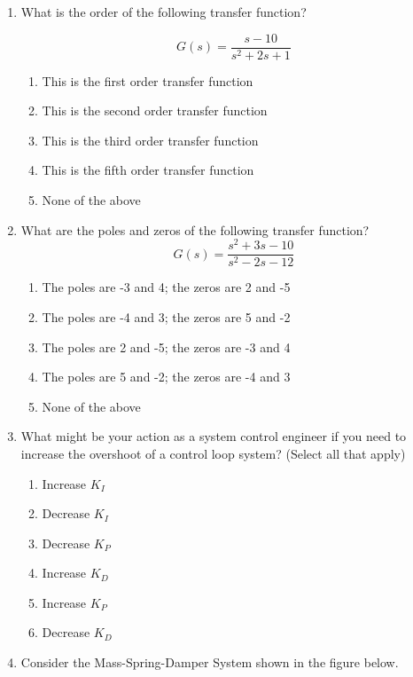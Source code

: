 \begin{enumerate}
\item What is the order of the following transfer function?

\begin{equation}
G(s) = \frac{s-10}{s^2 + 2s +1}
\end{equation}
	\begin{enumerate}
		\item  This is the first order transfer function
		\item This is the second order transfer function
		\item This is the third order transfer function
		\item This is the fifth order transfer function
		\item None of the above
	\end{enumerate}
	
\item What are the poles and zeros of the following transfer function?
\begin{equation}
G(s) = \frac{s^2 +3s-10}{s^2 - 2s -12}
\end{equation}
	\begin{enumerate}
		\item  The poles are -3 and 4; the zeros are 2 and -5
		\item The poles are -4 and 3; the zeros are 5 and -2
		\item The poles are 2 and -5; the zeros are -3 and 4
		\item The poles are 5 and -2; the zeros are -4 and 3
		\item None of the above
	\end{enumerate}
\item What might be your action as a system control engineer if you need to increase the overshoot of a control loop system? (Select all that apply)
	\begin{enumerate}
		\item Increase $K_I$
		\item Decrease $K_I$​
		\item Decrease $K_P$ ​
		\item Increase $K_D$ 
		\item Increase $K_P$​
		\item Decrease $K_D$​
	\end{enumerate}
\item Consider the Mass-Spring-Damper System shown in the figure below.


\end{enumerate}
